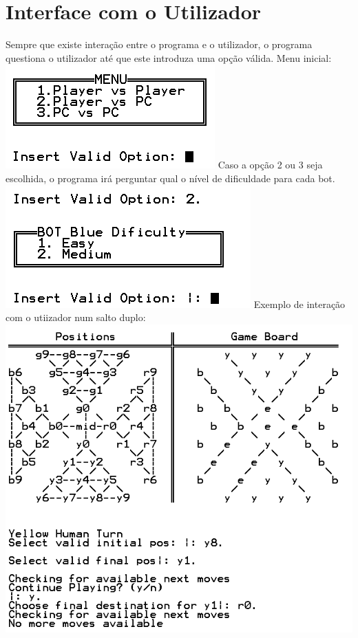 \documentclass[a4paper]{article}
\begin{document}
\section{Interface com o Utilizador}
Sempre que existe interação entre o programa e o utilizador, o programa questiona o utilizador até que este introduza uma opção válida.\linebreak
Menu inicial: \linebreak
\includegraphics[scale=0.8]{initialMenu.png}\linebreak\linebreak
Caso a opção 2 ou 3 seja escolhida, o programa irá perguntar qual o nível de dificuldade para cada bot.\linebreak
\includegraphics[scale=0.8]{chooseBotDifficulty.png}\linebreak\linebreak
Exemplo de interação com o utiizador num salto duplo:\linebreak
\includegraphics[scale=0.8]{doubleJump.png}\linebreak\linebreak
\end{document}
